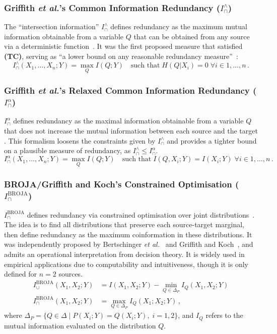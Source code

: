 \documentclass{article}
\makeatletter
\newcommand{\etalx}{\textit{et al.\@}\xspace}
\newcommand{\Xs}{X_1,\ldots,X_n}
\newcommand{\TC}{\textbf{(TC)}\xspace} %
\newcommand{\Iwedge}{\ensuremath{I_\cap^{\wedge}}\xspace}
\newcommand{\IBROJA}{\ensuremath{I_\cap^{\text{BROJA}}}\xspace}
\newcommand{\Ialpha}{\ensuremath{I_\cap^{\alpha}}\xspace}
\makeatother
\begin{document}
\subsubsection*{Griffith \etalx's Common Information Redundancy ($\Iwedge$)}
The ``intersection information'' \Iwedge defines redundancy as the maximum mutual information obtainable from a variable $Q$ that can be obtained from any source via a deterministic function~\cite{griffith2014intersection}. It was the first proposed measure that satisfied \TC, serving as ``a lower bound on any reasonable redundancy measure''~\cite{griffith2014intersection}:
    \begin{equation}
        I_\cap^\wedge(\Xs;Y) = \max_{Q} I(Q;Y) \quad\text{such that}\; H(Q|X_i)=0\; \forall i \in 1 , \ldots , n \,.
    \end{equation}

\subsubsection*{Griffith \etalx's Relaxed Common Information Redundancy ($\Ialpha$)}
$\Ialpha$ defines redundancy as the maximal information obtainable from a variable $Q$ that does not increase the mutual information between each source and the target \cite{griffith2015quantifying}. This formalism loosens the constraints given by $\Iwedge$ and provides a tighter bound on a plausible measure of redundancy, as $\Iwedge\leq \Ialpha$.
\begin{equation}
    I_\cap^\alpha(\Xs;Y) = \max_{Q} I(Q;Y) \quad\text{such that}\; I(Q,X_i;Y)=I(X_i;Y) \; \forall i \in 1 , \ldots , n \,.
\end{equation}

\subsubsection*{BROJA/Griffith and Koch's Constrained Optimisation ($\IBROJA$)}
$\IBROJA$ defines redundancy via constrained optimisation over joint distributions~\cite{bertschinger2014quantifying, griffith2014quantifying}. The idea is to find all distributions that preserve each source-target marginal, then define redundancy as the maximum coinformation in these distributions. It was independently proposed by Bertschinger \textit{et al.}~\cite{bertschinger2014quantifying} and Griffith and Koch~\cite{griffith2014quantifying}, and admits an operational interpretation from decision theory. It is widely used in empirical applications due to computability and intuitiveness, though it is only defined for $n=2$ sources.
    \begin{align}
        I_\cup^{\text{BROJA}}(X_1,X_2;Y)& = I(X_1,X_2;Y) - \min_{Q\in\Delta_P} I_Q(X_1,X_2;Y) \\
        I_\cap^{\text{BROJA}}(X_1,X_2;Y) &= \max_{Q\in\Delta_P} I_Q(X_1;X_2;Y) \,,
    \end{align}
    where $\Delta_P=\{Q\in\Delta \;|\; P(X_i;Y)=Q(X_i;Y) ,\;i=1,2\}$, and $I_Q$ refers to the mutual information evaluated on the distribution $Q$.
\end{document}
